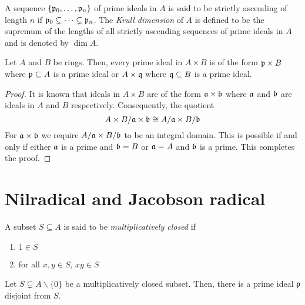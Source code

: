 \begin{definition}
    A sequence $\{\mathfrak p_0,\ldots,\mathfrak p_n\}$ of prime ideals in $A$ is said to be strictly ascending of length $n$ if $\mathfrak p_0\subsetneq\cdots\subsetneq\mathfrak p_n$. The \textit{Krull dimension} of $A$ is defined to be the supremum of the lengths of all strictly ascending sequences of prime ideals in $A$ and is denoted by $\dim A$.
\end{definition}

\begin{proposition}
    Let $A$ and $B$ be rings. Then, every prime ideal in $A\times B$ is of the form $\mathfrak p\times B$ where $\mathfrak p\subseteq A$ is a prime ideal or $A\times\mathfrak q$ where $\mathfrak q\subseteq B$ is a prime ideal.
\end{proposition}
\begin{proof}
    It is known that ideals in $A\times B$ are of the form $\mathfrak a\times\mathfrak b$ where $\mathfrak a$ and $\mathfrak b$ are ideals in $A$ and $B$ respectively. Consequently, the quotient 
    \begin{equation*}
        A\times B/\mathfrak a\times\mathfrak b\cong A/\mathfrak a\times B/\mathfrak b
    \end{equation*}
    For $\mathfrak a\times\mathfrak b$ we require $A/\mathfrak a\times B/\mathfrak b$ to be an integral domain. This is possible if and only if either $\mathfrak a$ is a prime and $\mathfrak b = B$ or $\mathfrak a = A$ and $\mathfrak b$ is a prime. This completes the proof.
\end{proof}

\section{Nilradical and Jacobson radical}

\begin{definition}
    A subset $S\subseteq A$ is said to be \textit{multiplicatively closed} if 
    \begin{enumerate}[label=(\alph*)]
        \item $1\in S$ 
        \item for all $x,y\in S$, $xy\in S$
    \end{enumerate}
\end{definition}

\begin{proposition}
    Let $S\subsetneq A\backslash\{0\}$ be a multiplicatively closed subset. Then, there is a prime ideal $\mathfrak p$ disjoint from $S$.
\end{proposition}


